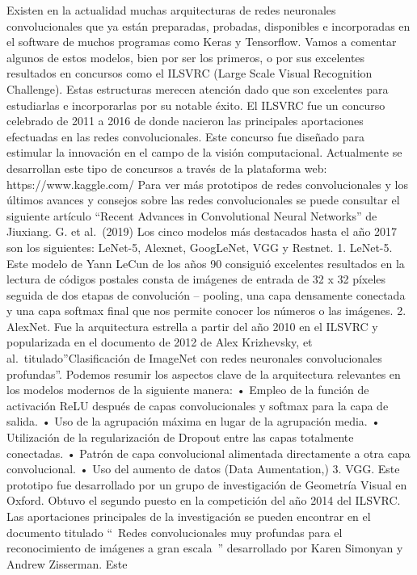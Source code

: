 \documentclass[
  a4paper,
  DIV=11,
  numbers=noendperiod]{scrreprt}
\begin{document}
Existen en la actualidad muchas arquitecturas de redes neuronales
convolucionales que ya están preparadas, probadas, disponibles e
incorporadas en el software de muchos programas como Keras y Tensorflow.
Vamos a comentar algunos de estos modelos, bien por ser los primeros, o
por sus excelentes resultados en concursos como el ILSVRC (Large Scale
Visual Recognition Challenge). Estas estructuras merecen atención dado
que son excelentes para estudiarlas e incorporarlas por su notable
éxito. El ILSVRC fue un concurso celebrado de 2011 a 2016 de donde
nacieron las principales aportaciones efectuadas en las redes
convolucionales. Este concurso fue diseñado para estimular la innovación
en el campo de la visión computacional. Actualmente se desarrollan este
tipo de concursos a través de la plataforma web: https://www.kaggle.com/
Para ver más prototipos de redes convolucionales y los últimos avances y
consejos sobre las redes convolucionales se puede consultar el siguiente
artículo ``Recent Advances in Convolutional Neural Networks'' de
Jiuxiang. G. et al.~(2019) Los cinco modelos más destacados hasta el año
2017 son los siguientes: LeNet-5, Alexnet, GoogLeNet, VGG y Restnet. 1.
LeNet-5. Este modelo de Yann LeCun de los años 90 consiguió excelentes
resultados en la lectura de códigos postales consta de imágenes de
entrada de 32 x 32 píxeles seguida de dos etapas de convolución --
pooling, una capa densamente conectada y una capa softmax final que nos
permite conocer los números o las imágenes. 2. AlexNet. Fue la
arquitectura estrella a partir del año 2010 en el ILSVRC y popularizada
en el documento de 2012 de Alex Krizhevsky, et
al.~titulado''Clasificación de ImageNet con redes neuronales
convolucionales profundas''. Podemos resumir los aspectos clave de la
arquitectura relevantes en los modelos modernos de la siguiente manera:
• Empleo de la función de activación ReLU después de capas
convolucionales y softmax para la capa de salida. • Uso de la agrupación
máxima en lugar de la agrupación media. • Utilización de la
regularización de Dropout entre las capas totalmente conectadas. •
Patrón de capa convolucional alimentada directamente a otra capa
convolucional. • Uso del aumento de datos (Data Aumentation,) 3. VGG.
Este prototipo fue desarrollado por un grupo de investigación de
Geometría Visual en Oxford. Obtuvo el segundo puesto en la competición
del año 2014 del ILSVRC. Las aportaciones principales de la
investigación se pueden encontrar en el documento titulado ``~Redes
convolucionales muy profundas para el reconocimiento de imágenes a gran
escala~'' desarrollado por Karen Simonyan y Andrew Zisserman. Este
\end{document}
